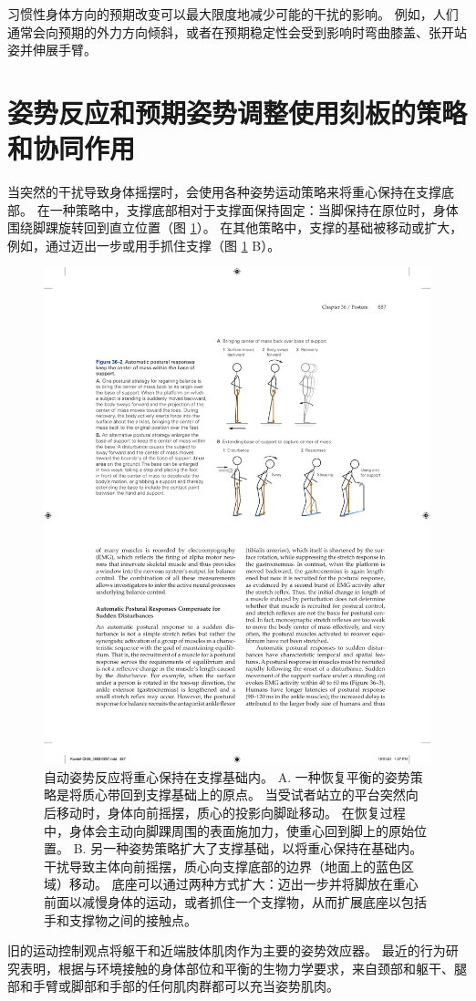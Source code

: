 习惯性身体方向的预期改变可以最大限度地减少可能的干扰的影响。
例如，人们通常会向预期的外力方向倾斜，或者在预期稳定性会受到影响时弯曲膝盖、张开站姿并伸展手臂。



\section{姿势反应和预期姿势调整使用刻板的策略和协同作用}

当突然的干扰导致身体摇摆时，会使用各种姿势运动策略来将重心保持在支撑底部。
在一种策略中，支撑底部相对于支撑面保持固定：当脚保持在原位时，身体围绕脚踝旋转回到直立位置（图 \ref{fig:36_2}）。
在其他策略中，支撑的基础被移动或扩大，例如，通过迈出一步或用手抓住支撑（图 \ref{fig:36_2} B）。


\begin{figure}[htbp]
	\centering
	\includegraphics[width=0.6\linewidth]{chap36/fig_36_2}
	\caption{自动姿势反应将重心保持在支撑基础内。 A. 一种恢复平衡的姿势策略是将质心带回到支撑基础上的原点。 当受试者站立的平台突然向后移动时，身体向前摇摆，质心的投影向脚趾移动。 在恢复过程中，身体会主动向脚踝周围的表面施加力，使重心回到脚上的原始位置。 B. 另一种姿势策略扩大了支撑基础，以将重心保持在基础内。 干扰导致主体向前摇摆，质心向支撑底部的边界（地面上的蓝色区域）移动。 底座可以通过两种方式扩大：迈出一步并将脚放在重心前面以减慢身体的运动，或者抓住一个支撑物，从而扩展底座以包括手和支撑物之间的接触点。}
	\label{fig:36_2}
\end{figure}


旧的运动控制观点将躯干和近端肢体肌肉作为主要的姿势效应器。
最近的行为研究表明，根据与环境接触的身体部位和平衡的生物力学要求，来自颈部和躯干、腿部和手臂或脚部和手部的任何肌肉群都可以充当姿势肌肉。


